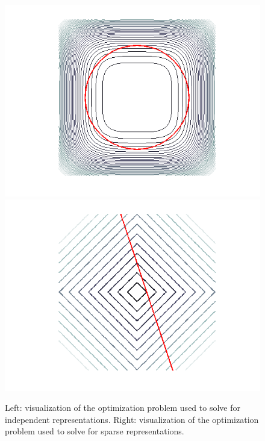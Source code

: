 \begin{figure} 
\centering
\includegraphics[scale=0.4]{./figures/related_work/ICA.png} 
\includegraphics[scale=0.4]{./figures/related_work/L1.png} 
\caption{Left: visualization of the optimization problem used to solve for independent representations. Right: visualization of the optimization problem used to solve for sparse representations.} 
\label{fig:ICA_lasso} 
\end{figure}  


